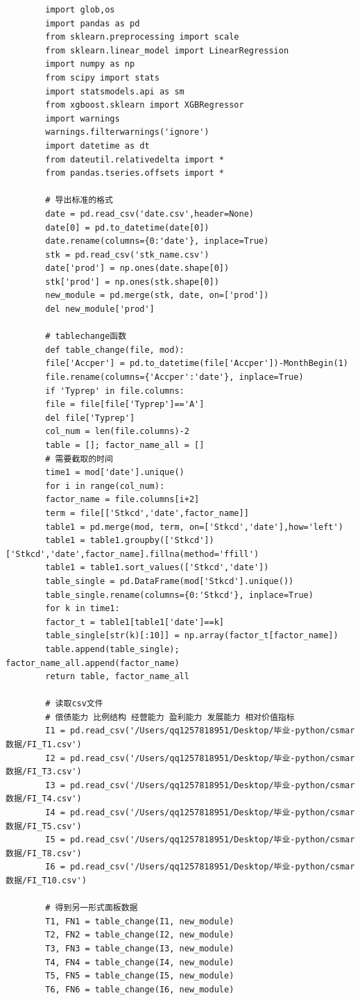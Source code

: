 \documentclass[12pt]{article} %
\begin{document}
	\begin{lstlisting}
		import glob,os
		import pandas as pd
		from sklearn.preprocessing import scale
		from sklearn.linear_model import LinearRegression
		import numpy as np
		from scipy import stats
		import statsmodels.api as sm
		from xgboost.sklearn import XGBRegressor
		import warnings
		warnings.filterwarnings('ignore')
		import datetime as dt
		from dateutil.relativedelta import *
		from pandas.tseries.offsets import *
		
		# 导出标准的格式
		date = pd.read_csv('date.csv',header=None)
		date[0] = pd.to_datetime(date[0])
		date.rename(columns={0:'date'}, inplace=True)
		stk = pd.read_csv('stk_name.csv')
		date['prod'] = np.ones(date.shape[0])
		stk['prod'] = np.ones(stk.shape[0])
		new_module = pd.merge(stk, date, on=['prod'])
		del new_module['prod']
		
		# tablechange函数
		def table_change(file, mod):
		file['Accper'] = pd.to_datetime(file['Accper'])-MonthBegin(1)
		file.rename(columns={'Accper':'date'}, inplace=True)
		if 'Typrep' in file.columns:
		file = file[file['Typrep']=='A']
		del file['Typrep']  
		col_num = len(file.columns)-2
		table = []; factor_name_all = []
		# 需要截取的时间
		time1 = mod['date'].unique()
		for i in range(col_num):
		factor_name = file.columns[i+2]
		term = file[['Stkcd','date',factor_name]]
		table1 = pd.merge(mod, term, on=['Stkcd','date'],how='left')
		table1 = table1.groupby(['Stkcd'])['Stkcd','date',factor_name].fillna(method='ffill')
		table1 = table1.sort_values(['Stkcd','date'])
		table_single = pd.DataFrame(mod['Stkcd'].unique())
		table_single.rename(columns={0:'Stkcd'}, inplace=True)
		for k in time1:
		factor_t = table1[table1['date']==k]
		table_single[str(k)[:10]] = np.array(factor_t[factor_name])
		table.append(table_single); factor_name_all.append(factor_name)
		return table, factor_name_all
		
		# 读取csv文件
		# 偿债能力 比例结构 经营能力 盈利能力 发展能力 相对价值指标
		I1 = pd.read_csv('/Users/qq1257818951/Desktop/毕业-python/csmar数据/FI_T1.csv')
		I2 = pd.read_csv('/Users/qq1257818951/Desktop/毕业-python/csmar数据/FI_T3.csv')
		I3 = pd.read_csv('/Users/qq1257818951/Desktop/毕业-python/csmar数据/FI_T4.csv')
		I4 = pd.read_csv('/Users/qq1257818951/Desktop/毕业-python/csmar数据/FI_T5.csv')
		I5 = pd.read_csv('/Users/qq1257818951/Desktop/毕业-python/csmar数据/FI_T8.csv')
		I6 = pd.read_csv('/Users/qq1257818951/Desktop/毕业-python/csmar数据/FI_T10.csv')
		
		# 得到另一形式面板数据
		T1, FN1 = table_change(I1, new_module)
		T2, FN2 = table_change(I2, new_module)
		T3, FN3 = table_change(I3, new_module)
		T4, FN4 = table_change(I4, new_module)
		T5, FN5 = table_change(I5, new_module)
		T6, FN6 = table_change(I6, new_module)
		

\end{lstlisting}
\end{document}
